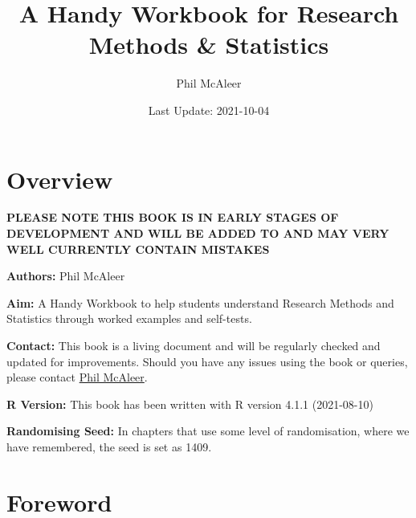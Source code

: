 \documentclass[
  oneside]{book}
\title{A Handy Workbook for Research Methods \& Statistics}
\author{Phil McAleer}
\date{Last Update: 2021-10-04}
\begin{document}
\maketitle

{
\setcounter{tocdepth}{1}
\tableofcontents
}
\hypertarget{overview}{%
\chapter*{Overview}\label{overview}}

\textbf{PLEASE NOTE THIS BOOK IS IN EARLY STAGES OF DEVELOPMENT AND WILL BE ADDED TO AND MAY VERY WELL CURRENTLY CONTAIN MISTAKES}

\textbf{Authors:} Phil McAleer

\textbf{Aim:} A Handy Workbook to help students understand Research Methods and Statistics through worked examples and self-tests.

\textbf{Contact:} This book is a living document and will be regularly checked and updated for improvements. Should you have any issues using the book or queries, please contact \href{mailto:philip.mcaleer@glasgow.ac.uk}{Phil McAleer}.

\textbf{R Version:} This book has been written with R version 4.1.1 (2021-08-10)

\textbf{Randomising Seed:} In chapters that use some level of randomisation, where we have remembered, the seed is set as 1409.

\hypertarget{foreword}{%
\chapter*{Foreword}\label{foreword}}
\end{document}
